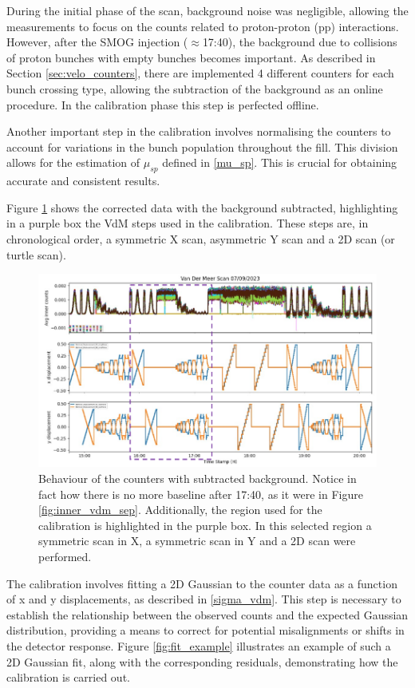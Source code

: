 During the initial phase of the scan, background noise was negligible, allowing the measurements to focus on the counts related to proton-proton (pp) interactions. However, after the SMOG injection ($\approx$17:40), the background due to collisions of proton bunches with empty bunches becomes important. As described in Section \ref{sec:velo_counters}, there are implemented 4 different counters for each bunch crossing type, allowing the subtraction of the background as an online procedure. In the calibration phase this step is perfected offline. 

Another important step in the calibration involves normalising the counters to account for variations in the bunch population throughout the fill. This division allows for the estimation of $\mu_{sp}$ defined in \eqref{mu_sp}. This is crucial for obtaining accurate and consistent results.

Figure \ref{fig:bkg_sub_calib} shows the corrected data with the background subtracted, highlighting in a purple box the VdM steps used in the calibration. These steps are, in chronological order, a symmetric X scan, asymmetric Y scan and a 2D scan (or turtle scan). 

\begin{figure}
    \centering
    \includegraphics[width=\textwidth]{figures/calibration_period.png}
    \caption{Behaviour of the counters with subtracted background. Notice in fact how there is no more baseline after 17:40, as it were in Figure \ref{fig:inner_vdm_sep}. Additionally, the region used for the calibration is highlighted in the purple box. In this selected region a symmetric scan in X, a symmetric scan in Y and a 2D scan were performed.}
    \label{fig:bkg_sub_calib}
\end{figure}

The calibration involves fitting a 2D Gaussian to the counter data as a function of x and y displacements, as described in \eqref{sigma_vdm}. This step is necessary to establish the relationship between the observed counts and the expected Gaussian distribution, providing a means to correct for potential misalignments or shifts in the detector response. Figure \ref{fig:fit_example} illustrates an example of such a 2D Gaussian fit, along with the corresponding residuals, demonstrating how the calibration is carried out.


